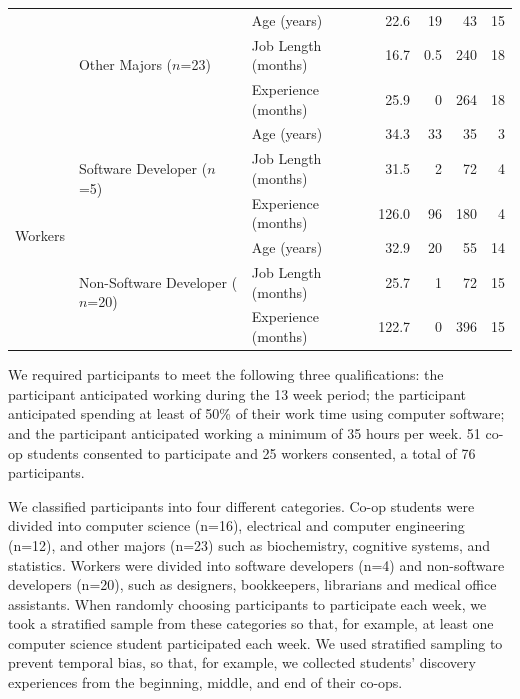 \documentclass[smallextended]{svjour3}
\begin{document}
\begin{center}
\begin{table}[t]
\begin{tabularx}{\linewidth}{p{17mm}p{27mm}Xrrrr}
          & \multirow{3}{25mm}{Other Majors ($n$=23)} & Age (years) & 22.6  & 19  & 43  & 15 \\
          &  & Job Length (months) & 16.7  & 0.5   & 240  & 18 \\
          &       & Experience (months) & 25.9  & 0   & 264  & 18 \\
 
 		\cline{1-7} 
 
    \multirow{6}{15mm}{Workers}  & \multirow{3}{25mm}{Software Developer ($n$=5)} & Age (years) & 34.3	& 33 & 35 & 3 \\
          &  & Job Length (months) & 31.5 & 2 & 72 & 4 \\
          &       & Experience (months) & 126.0 & 96 & 180 & 4 \\
                   
          \cline{2-7}
          & \multirow{3}{25mm}{Non-Software Developer ($n$=20)} & Age (years) & 32.9 & 20 & 55 & 14 \\
          &  & Job Length (months) & 25.7 & 1 & 72 & 15 \\
     	  &       & Experience (months) & 122.7 & 0 & 396 & 15 \\
					
	\end{tabularx}
\end{table}
\end{center}

We required participants to meet the following three qualifications:
the participant anticipated working during the 13 week period;
the participant anticipated spending at least of 50\% of their work time using computer software;
and the participant anticipated working a minimum of 35 hours per week. 
51 co-op students consented to participate and 25 workers consented,
a total of 76 participants.

We classified participants into four different categories.
Co-op students were divided into computer science (n=16),
electrical and computer engineering (n=12), 
and other majors (n=23) such as biochemistry, cognitive systems, and statistics.
Workers were divided into software developers (n=4) and 
non-software developers (n=20), such as designers, bookkeepers, librarians and medical office assistants.
When randomly choosing participants to participate each week, we took a stratified
sample from these categories so that, for example,
at least one computer science student participated each week. 
We used stratified sampling to prevent temporal bias, so that, for example,
we collected students' discovery experiences from the beginning, middle, and
end of their co-ops.
\end{document}
